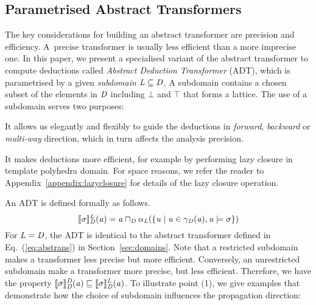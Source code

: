 \subsection{Parametrised Abstract Transformers} \label{sec:abst}
The key considerations for building an abstract transformer are 
precision and efficiency.  A~precise transformer is usually 
less efficient than a more imprecise one.  
In this paper, we present a specialised 
variant of the abstract transformer to compute deductions called 
\emph{Abstract Deduction Transformer} (ADT), which is 
parametrised by a given \emph{subdomain} $\mathit{L}\subseteq \mathit{D}$.  
%
A subdomain contains a chosen subset of the elements in $\mathit{D}$ including
$\bot$ and $\top$ that forms a lattice.
%
The use of a subdomain serves two purposes:
\begin{compactenum}[(1)]
\item It allows us elegantly and flexibly to guide the deductions in 
  {\em forward}, {\em backward} or {\em multi-way} direction, which 
  in turn affects the analysis precision.
\item It makes deductions more efficient, for example by performing lazy closure
  in template polyhedra domain. For space reasons, we refer the reader to 
  Appendix~\ref{appendix:lazyclosure} for details of the lazy closure operation. 
\end{compactenum}
%
An ADT is defined formally  as follows. 
\begin{equation}\label{eq:at2}
\llbracket \sigma \rrbracket_{\mathit{D}}^{\mathit{L}}(\mathit{a})=\mathit{a}\sqcap_{\mathit{D}} \alpha_{\mathit{L}}(\{\mathit{u}\mid \mathit{u}\in\gamma_{\mathit{D}}(\mathit{a}), \mathit{u}\models \sigma\})
\end{equation}
For $\mathit{L}=\mathit{D}$, the ADT is
identical to the abstract transformer defined in
Eq.~(\ref{eq:abstrans}) in Section~\ref{sec:domains}.  Note 
that a restricted subdomain makes a transformer less 
precise but more efficient.  Conversely, an
unrestricted subdomain make a transformer more precise, but less
efficient. Therefore, we have the property
$\llbracket \sigma \rrbracket_{\mathit{D}}^{\mathit{D}}(\mathit{a})\sqsubseteq
\llbracket \sigma \rrbracket_{\mathit{D}}^{\mathit{L}}(\mathit{a})$.
%
To illustrate point (1), 
we give examples that demonstrate how the choice of
subdomain influences the propagation direction:


